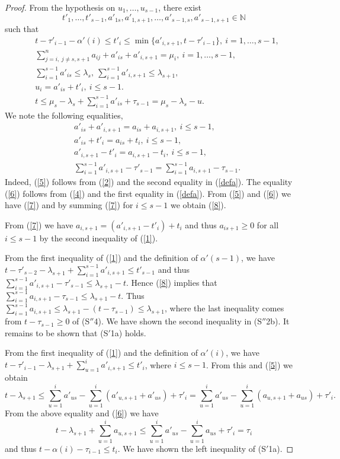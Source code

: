 \documentclass[ALCO,Unicode]{cedram}
\newcommand{\la}{\lambda}
\numberwithin{equation}{section}
\begin{document}
\begin{proof}
From the hypothesis on $u_1,\dots,u_{s-1}$, there exist \[t'_1,\dots,t'_{s-1},a'_{1s}, a'_{1,s+1},\dots,a'_{s-1,s}, a'_{s-1,s+1} \in \mathbb{N}\] such that \begin{align}\label{1}
	&t-\tau'_{i-1}-\alpha'(i) \le t'_i \le \min\{a'_{i,s+1}, t-\tau'_{i-1}\}, \  i=1,\dots,s-1, \\\label{2}
	&\sum_{j=i, \  j \neq s, s+1}^{n}a_{ij}+a'_{is}+a'_{i,s+1}=\mu_i, \  i=1,\dots,s-1,\\\label{3}
	&\sum_{i=1}^{s-1} a'_{is} \le \lambda_s, \  \sum_{i=1}^{s-1} a'_{i,s+1} \le \lambda_{s+1}, \  \\\label{4}
	&u_i=a'_{is}+t'_i, \  i \le s-1. \\\label{44}
	&t \le \mu_s - \lambda_s +\sum_{i=1}^{s-1}a'_{is}+\tau_{s-1}=\mu_s-\lambda_s-u.
\end{align}
We note the following equalities,
\begin{align}\label{5}
	&a'_{is}+a'_{i,s+1}=a_{is}+a_{i,s+1}, \  i\le s-1, \\\label{6}
	&a'_{is}+t'_{i}=a_{is}+t_{i}, \  i\le s-1,\\\label{7}
	&a'_{i,s+1}-t'_{i}=a_{i,s+1}-t_{i}, \  i\le s-1,\\\label{8}
	&\sum_{i=1}^{s-1}a'_{i,s+1}-\tau'_{s-1}=\sum_{i=1}^{s-1}a_{i,s+1}-\tau_{s-1}.
\end{align}
Indeed, (\ref{5}) follows from (\ref{2}) and the second equality in (\ref{defa}). The equality (\ref{6}) follows from (\ref{4}) and the first equality in (\ref{defa}). From (\ref{5}) and (\ref{6}) we have (\ref{7}) and by summing (\ref{7}) for $i\le s-1$ we obtain (\ref{8}).

From (\ref{7}) we have $a_{i,s+1}= (a'_{i,s+1} - t'_i)+t_i$ and thus 
$a_{is+1} \ge 0 $ for all $i \le s-1$ by the second inequality of (\ref{1}).


From the first inequality of (\ref{1}) and the definition of $\alpha'{(s-1)}$, we have $t-\tau'_{s-2}-\lambda_{s+1}+\sum_{i=1}^{s-1}a'_{i,s+1} \le t'_{s-1}$ and thus  $\sum_{i=1}^{s-1}a'_{i,s+1} - \tau'_{s-1} \le \lambda_{s+1} -t$.
Hence (\ref{8}) implies that	$\sum_{i=1}^{s-1}a_{i,s+1} - \tau_{s-1} \le \lambda_{s+1} -t$. Thus $\sum_{i=1}^{s-1}a_{i,s+1} \le \la_{s+1} -(t-\tau_{s-1}) \le \la_{s+1}$, where the last inequality comes from $t-\tau_{s-1} \ge 0$ of (S$''$4). We have shown the second inequality in (S$''$2b). It remains to be shown that (S$'$1a) holds.
	
	From the first inequality of (\ref{1}) and the definition of $\alpha'{(i)}$, we have $t-\tau'_{i-1}-\lambda_{s+1}+\sum_{u=1}^{i}a'_{i,s+1} \le t'_{i}$, where $i \le s-1$. From this and (\ref{5}) we obtain \[t-\lambda_{s+1} \le \sum_{u=1}^ia'_{us}-\sum_{u=1}^i(a'_{u,s+1}+a'_{us})+\tau'_i=\sum_{u=1}^ia'_{us}-\sum_{u=1}^i(a_{u,s+1}+a_{us})+\tau'_i.\]
 From the above equality and (\ref{6}) we have 
	\[t-\lambda_{s+1} +\sum_{u=1}^{i}a_{u,s+1} \le \sum_{u=1}^ia'_{us}-\sum_{u=1}^{i}a_{us}+
	\tau'_i=\tau_i\]
	and thus $t-\alpha(i)-\tau_{i-1} \le t_i$. We have shown the left inequality of (S$'$1a).
	

\end{proof}
\end{document}
